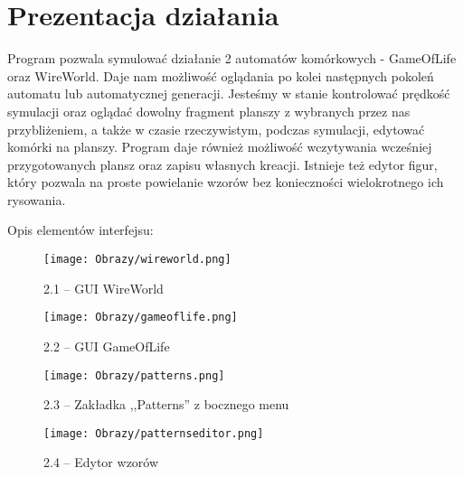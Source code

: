 \documentclass{mwart}
\begin{document}
\section{Prezentacja działania}
Program pozwala symulować działanie 2 automatów komórkowych - GameOfLife oraz WireWorld. Daje nam możliwość oglądania po kolei następnych pokoleń automatu lub automatycznej generacji. Jesteśmy w stanie kontrolować prędkość symulacji oraz oglądać dowolny fragment planszy z wybranych przez nas przybliżeniem, a także w czasie rzeczywistym, podczas symulacji, edytować komórki na planszy. Program daje również możliwość wczytywania wcześniej przygotowanych plansz oraz zapisu własnych kreacji. Istnieje też edytor figur, który pozwala na proste powielanie wzorów bez konieczności wielokrotnego ich rysowania.

Opis elementów interfejsu:

\begin{figure}[H]
	\centering
	\def\svgwidth{\columnwidth}
	\texttt{[image: Obrazy/wireworld.png]}
	\caption{2.1 -- GUI WireWorld}
	\texttt{[image: Obrazy/gameoflife.png]}
	\caption{2.2 -- GUI GameOfLife}
	\texttt{[image: Obrazy/patterns.png]}
	\caption{2.3 -- Zakładka ,,Patterns'' z bocznego menu}
	\texttt{[image: Obrazy/patternseditor.png]}
	\caption{2.4 -- Edytor wzorów}
\end{figure}
\end{document}
